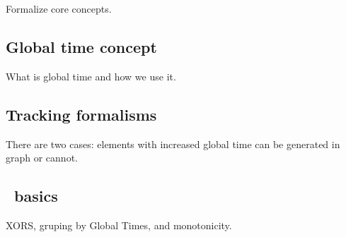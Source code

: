 \label {fs-acker-design}

Formalize core concepts.

\subsection{Global time concept}
What is global time and how we use it.

\subsection{Tracking formalisms}
There are two cases: elements with increased global time can be generated in graph or cannot.

\subsection{\tracker\ basics}
XORS, gruping by Global Times, and monotonicity. 



